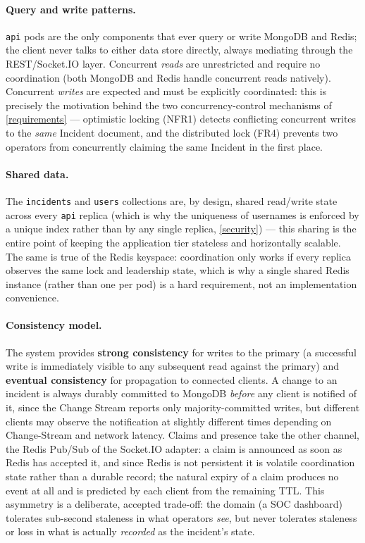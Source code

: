 \documentclass{scrartcl}
\begin{document}
\paragraph{Query and write patterns.} \texttt{api} pods are the only components that ever query or write MongoDB and Redis; the client never talks to either data store directly, always mediating through the REST/Socket.IO layer. Concurrent \emph{reads} are unrestricted and require no coordination (both MongoDB and Redis handle concurrent reads natively). Concurrent \emph{writes} are expected and must be explicitly coordinated: this is precisely the motivation behind the two concurrency-control mechanisms of \cref{requirements} --- optimistic locking (NFR1) detects conflicting concurrent writes to the \emph{same} Incident document, and the distributed lock (FR4) prevents two operators from concurrently claiming the same Incident in the first place.
 
\paragraph{Shared data.} The \texttt{incidents} and \texttt{users} collections are, by design, shared read/write state across every \texttt{api} replica (which is why the uniqueness of usernames is enforced by a unique index rather than by any single replica, \cref{security}) --- this sharing is the entire point of keeping the application tier stateless and horizontally scalable. The same is true of the Redis keyspace: coordination only works if every replica observes the same lock and leadership state, which is why a single shared Redis instance (rather than one per pod) is a hard requirement, not an implementation convenience.
 
\paragraph{Consistency model.} The system provides \textbf{strong consistency} for writes to the primary (a successful write is immediately visible to any subsequent read against the primary) and \textbf{eventual consistency} for propagation to connected clients. A change to an incident is always durably committed to MongoDB \emph{before} any client is notified of it, since the Change Stream reports only majority-committed writes, but different clients may observe the notification at slightly different times depending on Change-Stream and network latency. Claims and presence take the other channel, the Redis Pub/Sub of the Socket.IO adapter: a claim is announced as soon as Redis has accepted it, and since Redis is not persistent it is volatile coordination state rather than a durable record; the natural expiry of a claim produces no event at all and is predicted by each client from the remaining TTL. This asymmetry is a deliberate, accepted trade-off: the domain (a SOC dashboard) tolerates sub-second staleness in what operators \emph{see}, but never tolerates staleness or loss in what is actually \emph{recorded} as the incident's state.
 
\end{document}
